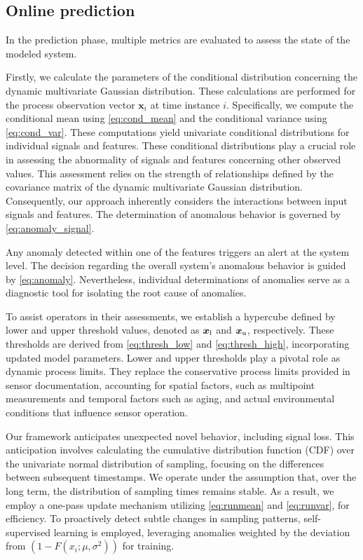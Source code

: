 \subsection{Online prediction}\label{predict}
In the prediction phase, multiple metrics are evaluated to assess the state of the modeled system.

Firstly, we calculate the parameters of the conditional distribution concerning the dynamic multivariate Gaussian distribution. These calculations are performed for the process observation vector $\boldsymbol{x}_i$ at time instance $i$. Specifically, we compute the conditional mean using \eqref{eq:cond_mean} and the conditional variance using \eqref{eq:cond_var}. These computations yield univariate conditional distributions for individual signals and features. These conditional distributions play a crucial role in assessing the abnormality of signals and features concerning other observed values. This assessment relies on the strength of relationships defined by the covariance matrix of the dynamic multivariate Gaussian distribution. Consequently, our approach inherently considers the interactions between input signals and features. The determination of anomalous behavior is governed by \eqref{eq:anomaly_signal}.

Any anomaly detected within one of the features triggers an alert at the system level. The decision regarding the overall system's anomalous behavior is guided by \eqref{eq:anomaly}. Nevertheless, individual determinations of anomalies serve as a diagnostic tool for isolating the root cause of anomalies.

To assist operators in their assessments, we establish a hypercube defined by lower and upper threshold values, denoted as $\boldsymbol{x} _{\text{l}}$ and $\boldsymbol{x} _{\text{u}}$, respectively. These thresholds are derived from \eqref{eq:thresh_low} and \eqref{eq:thresh_high}, incorporating updated model parameters. Lower and upper thresholds play a pivotal role as dynamic process limits. They replace the conservative process limits provided in sensor documentation, accounting for spatial factors, such as multipoint measurements and temporal factors such as aging, and actual environmental conditions that influence sensor operation.

Our framework anticipates unexpected novel behavior, including signal loss. This anticipation involves calculating the cumulative distribution function (CDF) over the univariate normal distribution of sampling, focusing on the differences between subsequent timestamps. We operate under the assumption that, over the long term, the distribution of sampling times remains stable. As a result, we employ a one-pass update mechanism utilizing \eqref{eq:runmean} and \eqref{eq:runvar}, for efficiency. To proactively detect subtle changes in sampling patterns, self-supervised learning is employed, leveraging anomalies weighted by the deviation from $(1 - F(x_i; \mu, \sigma^2))$ for training.

